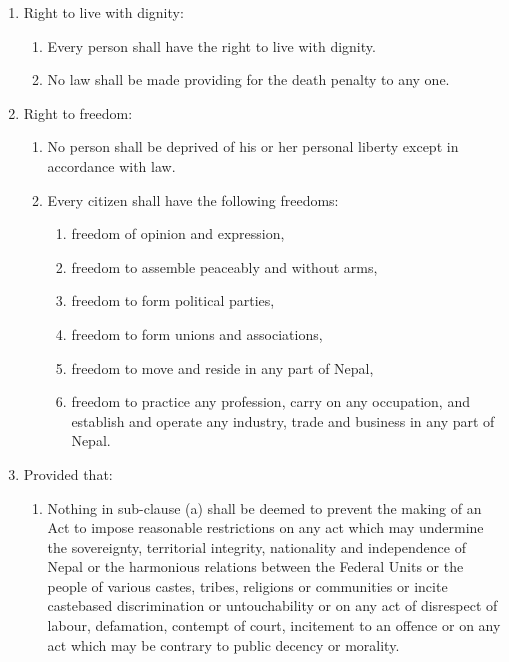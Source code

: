 \begin{questions}
\begin{solution}
  \begin{enumerate}
  \addtocounter{enumiii}{16} %
      \item Right to live with dignity:
      \begin{enumerate}
          \item Every person shall have the right to live with dignity.
          \item No law shall be made providing for the death penalty to any one.
      \end{enumerate}
      \item Right to freedom:
      \begin{enumerate}
          \item No person shall be deprived of his or her personal liberty except in accordance with law.
          \item Every citizen shall have the following freedoms:
          \begin{enumerate}
              \item freedom of opinion and expression,
              \item freedom to assemble peaceably and without arms,
              \item freedom to form political parties,
              \item freedom to form unions and associations,
              \item freedom to move and reside in any part of Nepal,
              \item freedom to practice any profession, carry on any occupation, and establish and operate any industry, trade and business in any part of Nepal.
          \end{enumerate}
      \end{enumerate}
      \item[] Provided that:
      \begin{enumerate}
          \item Nothing in sub-clause (a) shall be deemed to prevent the making of an Act to impose reasonable restrictions on any act which may undermine the sovereignty, territorial integrity, nationality and independence of Nepal or the harmonious relations between the Federal Units or the people of various castes, tribes, religions or communities or incite castebased discrimination or untouchability or on any act of disrespect of labour, defamation, contempt of court, incitement to an offence or on any act which may be contrary to public decency or morality.

\end{enumerate}
\end{enumerate}
\end{solution}
\end{questions}
